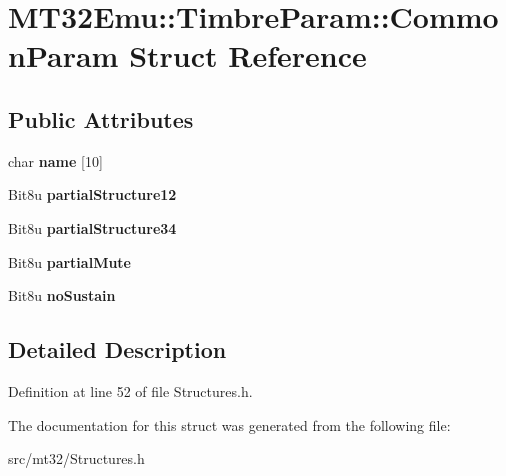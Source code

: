 \hypertarget{structMT32Emu_1_1TimbreParam_1_1CommonParam}{\section{M\-T32\-Emu\-:\-:Timbre\-Param\-:\-:Common\-Param Struct Reference}
\label{structMT32Emu_1_1TimbreParam_1_1CommonParam}
}
\subsection*{Public Attributes}
\begin{DoxyCompactItemize}
\item 
\hypertarget{structMT32Emu_1_1TimbreParam_1_1CommonParam_ae71c824685f48d3a44d511997f6faef8}{char {\bfseries name} \mbox{[}10\mbox{]}}\label{structMT32Emu_1_1TimbreParam_1_1CommonParam_ae71c824685f48d3a44d511997f6faef8}

\item 
\hypertarget{structMT32Emu_1_1TimbreParam_1_1CommonParam_a0f87e5977009af45422c44b6ab29f0f5}{Bit8u {\bfseries partial\-Structure12}}\label{structMT32Emu_1_1TimbreParam_1_1CommonParam_a0f87e5977009af45422c44b6ab29f0f5}

\item 
\hypertarget{structMT32Emu_1_1TimbreParam_1_1CommonParam_a92b2cbee977dd45d1f93d9e465ea7506}{Bit8u {\bfseries partial\-Structure34}}\label{structMT32Emu_1_1TimbreParam_1_1CommonParam_a92b2cbee977dd45d1f93d9e465ea7506}

\item 
\hypertarget{structMT32Emu_1_1TimbreParam_1_1CommonParam_a1ddabe78571b65f7f29a2d9e9c00f31d}{Bit8u {\bfseries partial\-Mute}}\label{structMT32Emu_1_1TimbreParam_1_1CommonParam_a1ddabe78571b65f7f29a2d9e9c00f31d}

\item 
\hypertarget{structMT32Emu_1_1TimbreParam_1_1CommonParam_a3607e7956d1a3ffbdc8caacc097c0bb9}{Bit8u {\bfseries no\-Sustain}}\label{structMT32Emu_1_1TimbreParam_1_1CommonParam_a3607e7956d1a3ffbdc8caacc097c0bb9}

\end{DoxyCompactItemize}


\subsection{Detailed Description}


Definition at line 52 of file Structures.\-h.



The documentation for this struct was generated from the following file\-:\begin{DoxyCompactItemize}
\item 
src/mt32/Structures.\-h\end{DoxyCompactItemize}
